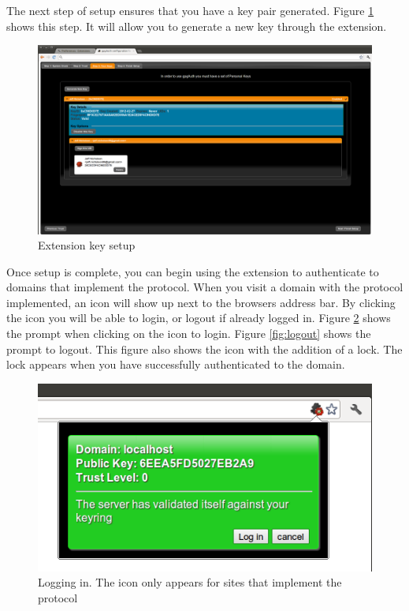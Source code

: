 \documentclass[11pt]{article}
\begin{document}
The next step of setup ensures that you have a key pair generated. Figure \ref{fig:keysetup} shows this step. It will allow you to generate a new key through the extension.\\
\begin{figure}[h!]
\centering
\includegraphics[scale=0.3]{ext_setup_keys}
\caption{Extension key setup}
\label{fig:keysetup}
\end{figure}

Once setup is complete, you can begin using the extension to authenticate to domains that implement the protocol. When you visit a domain with the protocol implemented, an icon will show up next to the browsers address bar. By clicking the icon you will be able to login, or logout if already logged in. Figure \ref{fig:login} shows the prompt when clicking on the icon to login. Figure \ref{fig:logout} shows the prompt to logout. This figure also shows the icon with the addition of a lock. The lock appears when you have successfully authenticated to the domain.\\
\begin{figure}[h!]
\centering
\includegraphics[scale=0.5]{ext_login}
\caption{Logging in. The icon only appears for sites that implement the protocol}
\label{fig:login}
\end{figure}
\end{document}
